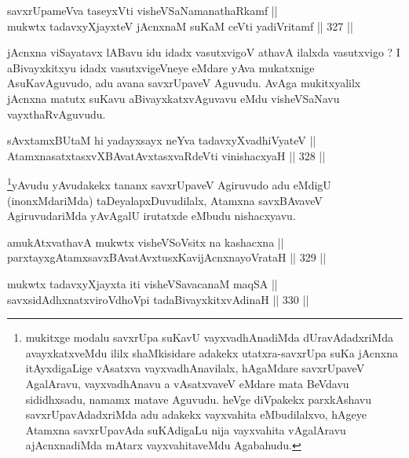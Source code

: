 \begin{shl}
savxrUpameVva taseyxVti visheVSaNamanathaRkamf || \\
mukwtx tadavxyXjayxteV jAcnxnaM suKaM \footnotemark[3]ceVti yadiVritamf \hfill || 327 ||  
\end{shl}

\begin{artha}
jAcnxna viSayatavx lABavu idu idadx vasutxvigoV athavA
ilalxda vasutxvigo ? I aBivayxkitxyu idadx vasutxvigeVneye eMdare yAva
mukatxnige AsuKavAguvudo, adu avana savxrUpaveV Aguvudu. AvAga
mukitxyalilx jAcnxna matutx suKavu aBivayxkatxvAguvavu eMdu
visheVSaNavu vayxthaRvAguvudu.
\end{artha}

\begin{shl}
sAvxtamxBUtaM hi yadayxsayx neYva tadavxyXvadhiVyateV || \\
AtamxnasatxtasxvXBAvatAvxtasxvaRdeVti vinishacxyaH \hfill || 328 ||  
\end{shl}

\begin{artha}
\footnote{mukitxge modalu savxrUpa suKavU vayxvadhAnadiMda
dUravAdadxriMda avayxkatxveMdu ililx shaMkisidare adakekx
utatxra-savxrUpa suKa jAcnxna itAyxdigaLige vAsatxva
vayxvadhAnavilalx, hAgaMdare savxrUpaveV AgalAravu, vayxvadhAnavu a
vAsatxvaveV eMdare mata BeVdavu sididhxsadu, namamx matave Aguvudu. heVge diVpakekx parxkAshavu savxrUpavAdadxriMda adu adakekx vayxvahita eMbudilalxvo, hAgeye Atamxna savxrUpavAda suKAdigaLu nija vayxvahita vAgalAravu ajAcnxnadiMda mAtarx vayxvahitaveMdu Agabahudu.}yAvudu yAvudakekx tananx savxrUpaveV Agiruvudo adu eMdigU
(inonxMdariMda) taDeyalapxDuvudilalx, Atamxna savxBAvaveV
AgiruvudariMda yAvAgalU irutatxde eMbudu nishacxyavu.
\end{artha}


\begin{shl}
amukAtxvathavA mukwtx visheVSoV\s sitx na kashacxna || \\
parxtayxgAtamxsavxBAvatAvxtusxKavijAcnxnayoVrataH \hfill || 329 ||  
\end{shl}

\begin{shl}
mukwtx tadavxyXjayxta iti visheVSavacanaM maqSA || \\
savxsidAdhxnatxviroVdhoV\s pi tadaBivayxkitxvAdinaH \hfill || 330 ||  
\end{shl}

